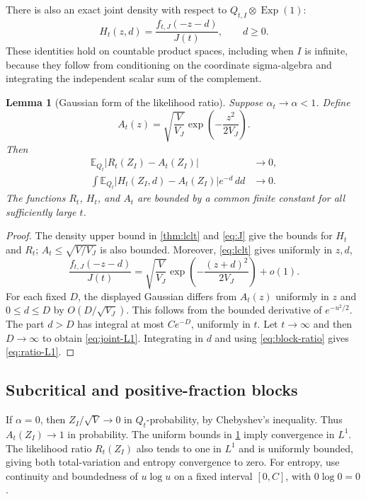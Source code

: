 \documentclass[11pt,a4paper]{article}
\numberwithin{equation}{section}
\newtheorem{lemma}[lemma]{Lemma}
\theoremstyle{definition}
\theoremstyle{remark}
\newcommand{\E}{\mathbb E}
\newcommand{\Qt}{Q_t}
\newcommand{\Exp}{\operatorname{Exp}}
\begin{document}
There is also an exact joint density with respect to
$Q_{t,I}\otimes\Exp(1)$:
\begin{equation}\label{eq:joint-ratio}
 H_t(z,d)=\frac{f_{t,J}(-z-d)}{J(t)},\qquad d\ge0.
\end{equation}
These identities hold on countable product spaces, including when
$I$ is infinite, because they follow from conditioning on the
coordinate sigma-algebra and integrating the independent scalar
sum of the complement.

\begin{lemma}[Gaussian form of the likelihood ratio]\label{lem:ratio}
Suppose $\alpha_t\to\alpha<1$. Define
\begin{equation}\label{eq:h-approx}
 A_t(z)=\sqrt{\frac{V}{V_J}}\exp\left(-\frac{z^2}{2V_J}\right).
\end{equation}
Then
\begin{align}
 \E_{\Qt}|R_t(Z_I)-A_t(Z_I)|&\to0,\label{eq:ratio-L1}\\
 \int\E_{\Qt}|H_t(Z_I,d)-A_t(Z_I)|e^{-d}\,dd&\to0.\label{eq:joint-L1}
\end{align}
The functions $R_t$, $H_t$, and $A_t$ are bounded by a common finite
constant for all sufficiently large $t$.
\end{lemma}
\begin{proof}
The density upper bound in \cref{thm:lclt} and \cref{eq:J} give the
bounds for $H_t$ and $R_t$; $A_t\le\sqrt{V/V_J}$ is also bounded.
Moreover, \cref{eq:lclt} gives uniformly in $z,d$,
\[
 \frac{f_{t,J}(-z-d)}{J(t)}
 =\sqrt{\frac{V}{V_J}}
   \exp\left(-\frac{(z+d)^2}{2V_J}\right)+o(1).
\]
For each fixed $D$, the displayed Gaussian differs from $A_t(z)$
uniformly in $z$ and $0\le d\le D$ by $O(D/\sqrt{V_J})$.
This follows from the bounded derivative of $e^{-u^2/2}$.
The part $d>D$ has integral at most $Ce^{-D}$, uniformly in $t$.
Let $t\to\infty$ and then $D\to\infty$ to obtain
\cref{eq:joint-L1}. Integrating in $d$ and using
\cref{eq:block-ratio} gives \cref{eq:ratio-L1}.
\end{proof}

\subsection{Subcritical and positive-fraction blocks}
If $\alpha=0$, then $Z_I/\sqrt V\to0$ in $Q_t$-probability, by
Chebyshev's inequality. Thus $A_t(Z_I)\to1$ in probability.
The uniform bounds in \cref{lem:ratio} imply convergence in $L^1$.
The likelihood ratio $R_t(Z_I)$ also tends to one in $L^1$ and is
uniformly bounded, giving both total-variation and entropy convergence
to zero. For entropy, use continuity and boundedness of $u\log u$ on
a fixed interval $[0,C]$, with $0\log0=0$.
\end{document}

